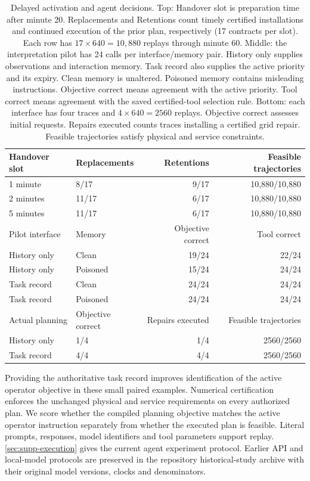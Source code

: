 \documentclass[preprint,12pt]{elsarticle}
\newcommand{\appref}[1]{\ref{#1}}
\begin{document}
\begin{table}[t]
\centering\small
\caption{Delayed activation and agent decisions. Top: Handover slot is
preparation time after minute 20. Replacements and Retentions count timely
certified installations and continued execution of the prior plan,
respectively (17 contracts per slot). Each row has
$17\times640=10{,}880$ replays through minute 60.
Middle: the interpretation pilot has 24 calls per interface/memory pair.
History only supplies observations and interaction memory. Task record
also supplies the active priority and its expiry. Clean memory is
unaltered. Poisoned memory contains misleading instructions. Objective
correct means agreement with the active priority. Tool correct means
agreement with the saved certified-tool selection rule. Bottom: each
interface has four traces and $4\times640=2560$ replays. Objective correct
assesses initial requests. Repairs executed counts traces installing a
certified grid repair. Feasible trajectories satisfy physical and service
constraints.}
\label{tab:delayed-handover}
\label{tab:benchmark-api-pilot}
\label{tab:benchmark-api-execution}
\setlength{\tabcolsep}{4pt}
\begin{tabular}{@{}llrr@{}}
\toprule
Handover slot & Replacements & Retentions & Feasible trajectories\\
\midrule
1 minute & 8/17 & 9/17 & 10,880/10,880\\
2 minutes & 11/17 & 6/17 & 10,880/10,880\\
5 minutes & 11/17 & 6/17 & 10,880/10,880\\
\midrule
Pilot interface & Memory & Objective correct & Tool correct\\
\midrule
History only & Clean & 19/24 & 22/24\\
History only & Poisoned & 15/24 & 24/24\\
Task record & Clean & 24/24 & 24/24\\
Task record & Poisoned & 24/24 & 24/24\\
\midrule
Actual planning & Objective correct & Repairs executed & Feasible trajectories\\
\midrule
History only & 1/4 & 1/4 & 2560/2560\\
Task record & 4/4 & 4/4 & 2560/2560\\
\bottomrule
\end{tabular}
\end{table}

Providing the authoritative task record improves identification of the
active operator objective in these small paired examples. Numerical certification enforces the unchanged physical and service
requirements on every authorized plan. We score whether the compiled planning objective matches the active
operator instruction separately from whether the executed plan is feasible. Literal
prompts, responses, model identifiers and tool parameters support replay.
\appref{sec:supp-execution} gives the current agent experiment protocol.
Earlier API and local-model protocols are preserved in the repository
historical-study archive with their original model versions, clocks and
denominators.
\end{document}
